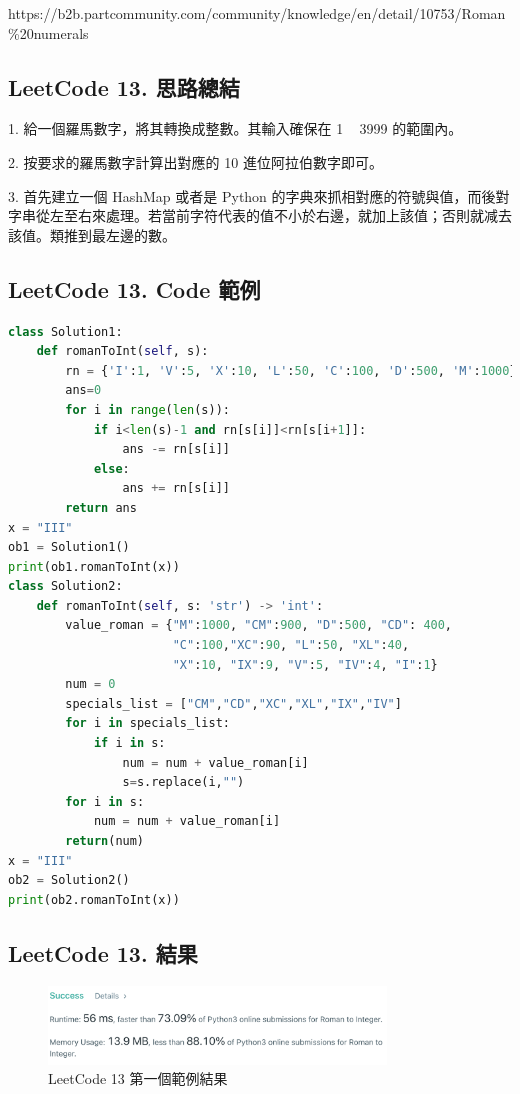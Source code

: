 \documentclass[10pt,UTF8]{ctexart}
\begin{document}
https://b2b.partcommunity.com/community/knowledge/en/detail/10753/Roman\%20numerals

\subsection{LeetCode 13. 思路總結}

1. 給一個羅馬數字，將其轉換成整數。其輸入確保在 1 ~ 3999 的範圍內。

2. 按要求的羅馬數字計算出對應的 10 進位阿拉伯數字即可。

3. 首先建立一個 HashMap 或者是 Python 的字典來抓相對應的符號與值，而後對字串從左至右來處理。若當前字符代表的值不小於右邊，就加上該值；否則就减去該值。類推到最左邊的數。

\subsection{LeetCode 13. Code 範例}

\begin{lstlisting}[language={python}]
class Solution1:
    def romanToInt(self, s):
        rn = {'I':1, 'V':5, 'X':10, 'L':50, 'C':100, 'D':500, 'M':1000}        
        ans=0        
        for i in range(len(s)):            
            if i<len(s)-1 and rn[s[i]]<rn[s[i+1]]:                
                ans -= rn[s[i]]
            else:
                ans += rn[s[i]]
        return ans
x = "III"
ob1 = Solution1()
print(ob1.romanToInt(x))
class Solution2:
    def romanToInt(self, s: 'str') -> 'int':
        value_roman = {"M":1000, "CM":900, "D":500, "CD": 400,
                       "C":100,"XC":90, "L":50, "XL":40,
                       "X":10, "IX":9, "V":5, "IV":4, "I":1}
        num = 0
        specials_list = ["CM","CD","XC","XL","IX","IV"]
        for i in specials_list:
            if i in s:
                num = num + value_roman[i]
                s=s.replace(i,"")
        for i in s:
            num = num + value_roman[i]
        return(num)
x = "III"
ob2 = Solution2()
print(ob2.romanToInt(x))
\end{lstlisting}

\subsection{LeetCode 13. 結果}

\begin{figure}[H]
\centering 
\includegraphics[width=0.80\textwidth]{lc-13-1.png} 
\caption{LeetCode 13 第一個範例結果}
\label{Test}
\end{figure}
\end{document}
